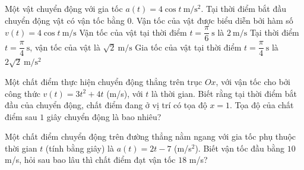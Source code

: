 \begin{ex}%
	Một vật chuyển động với gia  tốc $a(t)=4\cos t~\mathrm{m/s^2}$. Tại thời điểm bắt đầu chuyển động vật có vận tốc bằng $0$.
	 \choiceTF
		{Vận tốc của vật được biểu diễn  bởi hàm số $v(t)=4\cos t~\mathrm{m/s}$}
		 {\True Vận tốc của vật tại thời điểm $t=\dfrac{\pi}{6}~\mathrm{s}$ là $2~\mathrm{m/s}$}
		{Tại thời điểm $t=\dfrac{\pi}{4}~\mathrm{s}$, vận tốc của  vật là $\sqrt{2}~\mathrm{m/s}$}
		{\True  Gia tốc của vật tại thời điểm $t=\dfrac{\pi}{4}~\mathrm{s}$ là $2\sqrt{2}~\mathrm{m/s^2}$}
\end{ex}

\begin{bt}%
	Một chất điểm thực hiện chuyển động thẳng trên trục $Ox$, với vận tốc cho bởi công thức $v(t) = 3t^2 + 4t$ (m/s), với $t$ là thời gian. Biết rằng tại thời điểm bắt đầu của chuyển động, chất điểm đang ở vị trí có tọa độ $x = 1$. Tọa độ của chất điểm sau $1$ giây chuyển  động là bao nhiêu?
\end{bt}

\begin{bt}%
	Một chất điểm chuyển động trên đường thẳng nằm ngang với gia tốc phụ thuộc thời gian $t$ (tính bằng giây) là $a(t) =  2t - 7$ (m/s$^2$). Biết vận tốc đầu bằng $10$ m/s, hỏi sau bao lâu thì chất điểm đạt vận tốc $18$ m/s?
\end{bt}

